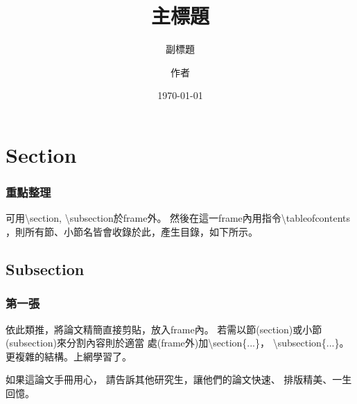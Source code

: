 \documentclass[a4paper,12pt]{beamer}
\begin{document}
\title{主標題}
\subtitle{副標題}
\author{作者}
\date{\today}
\maketitle
\section{Section}
\begin{frame}[t]
\frametitle{重點整理}
可用\textbackslash{section},
\textbackslash{subsection}於frame外。
然後在這一frame內用指令\textbackslash tableofcontents
，則所有節、小節名皆會收錄於此，產生目錄，如下所示。
\tableofcontents
\end{frame}
\subsection{Subsection}
\begin{frame}[t]
\frametitle{第一張}
依此類推，將論文精簡直接剪貼，放入frame內。
若需以節(section)或小節(subsection)來分割內容則於適當
處(frame外)加\textbackslash section\{...\}，
\textbackslash subsection\{...\}。
更複雜的結構。上網學習了。
\vspace{1cm}

{\Large 如果這論文手冊用心，
請告訴其他研究生，讓他們的論文快速、
排版精美、一生回憶。}
\end{frame}
\end{document}
